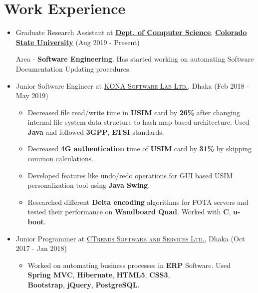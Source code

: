 \documentclass[a4paper,10pt]{article}
\begin{document}
\section{Work Experience}
\begin{itemize}
    \item Graduate Research Assistant at \href{http://compsci.colostate.edu}{\textbf{Dept. of Computer Science}}, \href{https://www.coloslostate.edu}{\textbf{\textbf{Colorado State University}}} \hfill (Aug 2019 - Present)
    
    Area - \textbf{Software Engineering}. Has started working on automating Software Documentation Updating procedures. 
    
    \item Junior Software Engineer at \href{http://www.konai.com}{\textsc{KONA Software Lab Ltd.}}, Dhaka \hfill (Feb 2018 - May 2019)
    \begin{itemize}%
         \item Decreased file read/write time in \textbf{USIM} card by \textbf{26\%} after changing internal file system data structure to hash map based architecture. Used \textbf{Java} and followed \textbf{3GPP}, \textbf{ETSI} standards.
         \item Decreased \textbf{4G authentication} time of \textbf{USIM} card by \textbf{31\%} by skipping common calculations.
         \item Developed features like undo/redo operations for GUI based USIM personalization tool using \textbf{Java Swing}.
         \item Researched different \textbf{Delta encoding} algorithms for FOTA servers and tested their performance on \textbf{Wandboard Quad}. Worked with \textbf{C}, \textbf{u-boot}.
    \end{itemize}
    
    \item Junior Programmer at \href{http://www.ctrends-software.com}{\textsc{CTrends Software and Services Ltd.}}, Dhaka \hfill (Oct 2017 - Jan 2018)
    \begin{itemize}
         \item Worked on automating business processes in \textbf{ERP} Software. Used \textbf{Spring MVC}, \textbf{Hibernate}, \textbf{HTML5}, \textbf{CSS3},\\ \textbf{Bootstrap}, \textbf{jQuery}, \textbf{PostgreSQL}.
     \end{itemize}
     
\end{itemize}
\end{document}

